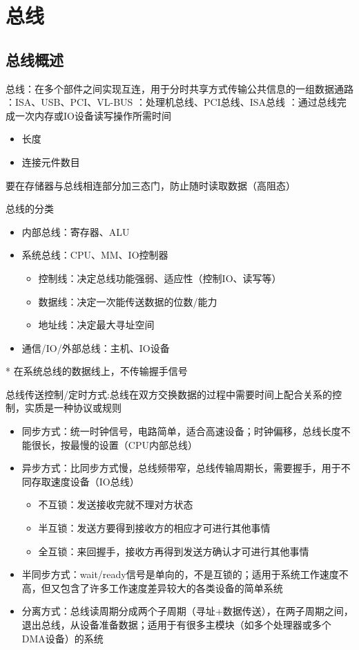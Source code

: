 
\section{总线}
\subsection{总线概述}
总线：在多个部件之间实现互连，用于分时共享方式传输公共信息的一组数据通路
：ISA、USB、PCI、VL-BUS
：处理机总线、PCI总线、ISA总线
：通过总线完成一次内存或IO设备读写操作所需时间
\begin{itemize}
	\item 长度
	\item 连接元件数目
\end{itemize}
要在存储器与总线相连部分加三态门，防止随时读取数据（高阻态）
\par 总线的分类
\begin{itemize}
	\item 内部总线：寄存器、ALU
	\item 系统总线：CPU、MM、IO控制器
	\begin{itemize}
		\item 控制线：决定总线功能强弱、适应性（控制IO、读写等）
		\item 数据线：决定一次能传送数据的位数/能力
		\item 地址线：决定最大寻址空间
	\end{itemize}
	\item 通信/IO/外部总线：主机、IO设备
\end{itemize}
* 在系统总线的数据线上，不传输握手信号
\par 总线传送控制/定时方式:总线在双方交换数据的过程中需要时间上配合关系的控制，实质是一种协议或规则
\begin{itemize}
	\item 同步方式：统一时钟信号，电路简单，适合高速设备；时钟偏移，总线长度不能很长，按最慢的设置（CPU内部总线）
	\item 异步方式：比同步方式慢，总线频带窄，总线传输周期长，需要握手，用于不同存取速度设备（IO总线）
	\begin{itemize}
		\item 不互锁：发送接收完就不理对方状态
		\item 半互锁：发送方要得到接收方的相应才可进行其他事情
		\item 全互锁：来回握手，接收方再得到发送方确认才可进行其他事情
	\end{itemize}
	\item 半同步方式：wait/ready信号是单向的，不是互锁的；适用于系统工作速度不高，但又包含了许多工作速度差异较大的各类设备的简单系统
	\item 分离方式：总线读周期分成两个子周期（寻址+数据传送），在两子周期之间，退出总线，从设备准备数据；适用于有很多主模块（如多个处理器或多个DMA设备）的系统
\end{itemize}
